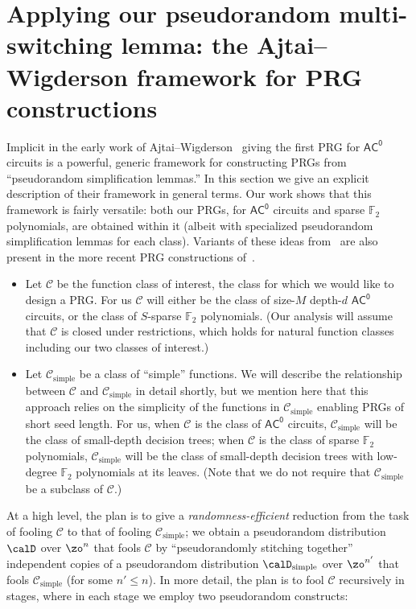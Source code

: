 \documentclass[11pt]{article}
\numberwithin{equation}{section}
\theoremstyle{definition}
\theoremstyle{plain}
\theoremstyle{plain}
\newcommand{\acz}{\mathsf{AC^0}}
\newcommand{\simple}{\mathrm{simple}}
\renewcommand{\F}{\mathds{F}}
\begin{document}
\section{Applying our pseudorandom multi-switching lemma: the Ajtai--Wigderson framework for PRG constructions} 
\label{sec:AW} 

Implicit in the early work of Ajtai--Wigderson~\cite{AjtaiWigderson:85} giving the first PRG for $\acz$ circuits is a powerful, generic framework for constructing PRGs from ``pseudorandom simplification lemmas.'' In this section we give an explicit description of their framework in general terms. Our work shows that this framework is fairly versatile: both our PRGs, for $\acz$ circuits and sparse $\F_2$ polynomials, are obtained within it (albeit with specialized pseudorandom simplification lemmas for each class). Variants of these ideas from~\cite{AjtaiWigderson:85} are also present in the more recent PRG constructions of~\cite{GMRTV12,IMZ12journal,RSV13,TX13,MRT19}.  



\begin{itemize} 
\item Let $\mathscr{C}$ be the function class of interest, the class for which we would like to design a PRG. For us $\mathscr{C}$ will either be the class of size-$M$ depth-$d$ $\acz$ circuits, or the class of $S$-sparse $\F_2$ polynomials. (Our analysis will assume that $\mathscr{C}$ is closed under restrictions, which holds for natural function classes including our two classes of interest.)
\item Let $\mathscr{C}_\simple$ be a class of ``simple'' functions. We will describe the relationship between $\mathscr{C}$ and $\mathscr{C}_\simple$ in detail shortly, but we mention here that this approach relies on the simplicity of the functions in $\mathscr{C}_\simple$ enabling PRGs of short seed length. For us, when $\mathscr{C}$ is the class of $\acz$ circuits, $\mathscr{C}_\simple$ will be the class of small-depth decision trees; when $\mathscr{C}$ is the class of sparse $\F_2$ polynomials, $\mathscr{C}_\simple$ will be the class of small-depth decision trees with low-degree $\F_2$ polynomials at its leaves. (Note that we do not require that $\mathscr{C}_\simple$ be a subclass of $\mathscr{C}$.) 
\end{itemize} 

At a high level, the plan is to give a \emph{randomness-efficient} reduction from the task of fooling $\mathscr{C}$ to that of fooling $\mathscr{C}_\simple$;  we obtain a pseudorandom distribution $\calD$ over $\zo^n$ that fools $\mathscr{C}$ by ``pseudorandomly stitching together'' independent copies of a pseudorandom distribution $\calD_\simple$ over $\zo^{n'}$ that fools $\mathscr{C}_\simple$ (for some $n' \le n$).  In more detail, the plan is to fool $\mathscr{C}$ recursively in stages, where in each stage we employ two pseudorandom constructs: 
\end{document}
